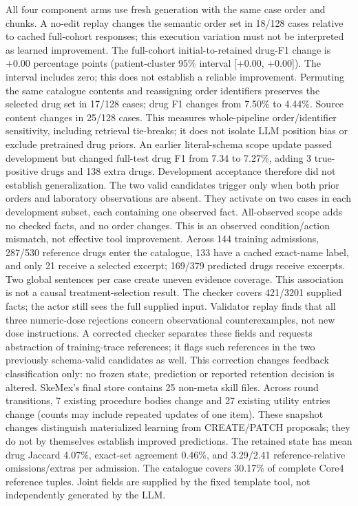 \begin{table}[t]
\end{table}All four component arms use fresh generation with the same case order and chunks. A no-edit replay changes the semantic order set in 18/128 cases relative to cached full-cohort responses; this execution variation must not be interpreted as learned improvement. The full-cohort initial-to-retained drug-F1 change is +0.00 percentage points (patient-cluster 95\% interval [+0.00, +0.00]). The interval includes zero; this does not establish a reliable improvement. Permuting the same catalogue contents and reassigning order identifiers preserves the selected drug set in 17/128 cases; drug F1 changes from 7.50\% to 4.44\%. Source content changes in 25/128 cases. This measures whole-pipeline order/identifier sensitivity, including retrieval tie-breaks; it does not isolate LLM position bias or exclude pretrained drug priors. An earlier literal-schema scope update passed development but changed full-test drug F1 from 7.34 to 7.27\%, adding 3 true-positive drugs and 138 extra drugs. Development acceptance therefore did not establish generalization. The two valid candidates trigger only when both prior orders and laboratory observations are absent. They activate on two cases in each development subset, each containing one observed fact. All-observed scope adds no checked facts, and no order changes. This is an observed condition/action mismatch, not effective tool improvement. Across 144 training admissions, 287/530 reference drugs enter the catalogue, 133 have a cached exact-name label, and only 21 receive a selected excerpt; 169/379 predicted drugs receive excerpts. Two global sentences per case create uneven evidence coverage. This association is not a causal treatment-selection result. The checker covers 421/3201 supplied facts; the actor still sees the full supplied input. Validator replay finds that all three numeric-dose rejections concern observational counterexamples, not new dose instructions. A corrected checker separates these fields and requests abstraction of training-trace references; it flags such references in the two previously schema-valid candidates as well. This correction changes feedback classification only: no frozen state, prediction or reported retention decision is altered. SkeMex's final store contains 25 non-meta skill files. Across round transitions, 7 existing procedure bodies change and 27 existing utility entries change (counts may include repeated updates of one item). These snapshot changes distinguish materialized learning from CREATE/PATCH proposals; they do not by themselves establish improved predictions. The retained state has mean drug Jaccard 4.07\%, exact-set agreement 0.46\%, and 3.29/2.41 reference-relative omissions/extras per admission. The catalogue covers 30.17\% of complete Core4 reference tuples. Joint fields are supplied by the fixed template tool, not independently generated by the LLM. \begin{table}[t]\centering\small

\end{table}
